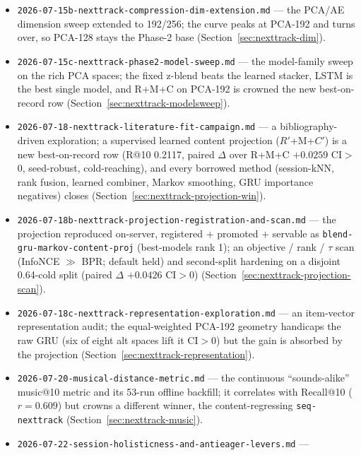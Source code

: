 \documentclass[11pt]{article}
\newcommand{\Rp}{\ensuremath{R'}}
\newcommand{\Cp}{\ensuremath{C'}}
\begin{document}
\begin{itemize}
    first-class graded-relevance metrics (artist@k / genre@k / artist\_mrr) and
    new leak-free base learners; content-kNN is the only additive signal, tying
    the champion on AE-64 (Section~\ref{sec:nexttrack-graded}).
  \item \texttt{2026-07-15b-nexttrack-compression-dim-extension.md} --- the
    PCA/AE dimension sweep extended to 192/256; the curve peaks at PCA-192 and
    turns over, so PCA-128 stays the Phase-2 base (Section~\ref{sec:nexttrack-dim}).
  \item \texttt{2026-07-15c-nexttrack-phase2-model-sweep.md} --- the
    model-family sweep on the rich PCA spaces; the fixed z-blend beats the
    learned stacker, LSTM is the best single model, and R+M+C on PCA-192 is
    crowned the new best-on-record row (Section~\ref{sec:nexttrack-modelsweep}).
  \item \texttt{2026-07-18-nexttrack-literature-fit-campaign.md} --- a
    bibliography-driven exploration; a supervised learned content projection
    (\Rp+M+\Cp) is a new best-on-record row (R@10 \num{0.2117}, paired $\Delta$ over
    R+M+C $+\num{0.0259}$ CI$>$0, seed-robust, cold-reaching), and every borrowed
    method (session-kNN, rank fusion, learned combiner, Markov smoothing, GRU
    importance negatives) closes (Section~\ref{sec:nexttrack-projection-win}).
  \item \texttt{2026-07-18b-nexttrack-projection-registration-and-scan.md} --- the
    projection reproduced on-server, registered $+$ promoted $+$ servable as
    \texttt{blend-gru-markov-content-proj} (best-models rank 1); an objective / rank
    / $\tau$ scan (InfoNCE $\gg$ BPR; default held) and second-split hardening on a
    disjoint 0.64-cold split (paired $\Delta$ $+\num{0.0426}$ CI$>$0)
    (Section~\ref{sec:nexttrack-projection-scan}).
  \item \texttt{2026-07-18c-nexttrack-representation-exploration.md} --- an
    item-vector representation audit; the equal-weighted PCA-192 geometry handicaps
    the raw GRU (six of eight alt spaces lift it CI$>$0) but the gain is absorbed by
    the projection (Section~\ref{sec:nexttrack-representation}).
  \item \texttt{2026-07-20-musical-distance-metric.md} --- the continuous
    ``sounds-alike'' music@10 metric and its 53-run offline backfill; it correlates
    with Recall@10 ($r=\num{0.609}$) but crowns a different winner, the
    content-regressing \texttt{seq-nexttrack} (Section~\ref{sec:nexttrack-music}).
  \item \texttt{2026-07-22-session-holisticness-and-antieager-levers.md} ---

\end{itemize}
\end{document}
